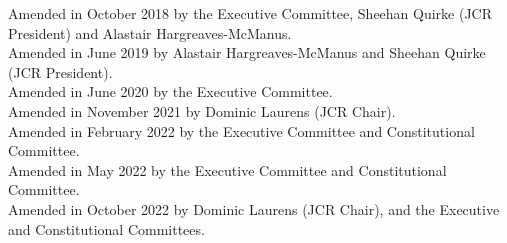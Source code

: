 \documentclass[12pt]{article}
\begin{document}
Amended in October 2018 by the Executive Committee, Sheehan Quirke (JCR President) and Alastair Hargreaves-McManus.\\
Amended in June 2019 by Alastair Hargreaves-McManus and Sheehan Quirke (JCR President).\\
Amended in June 2020 by the Executive Committee.\\
Amended in November 2021 by Dominic Laurens (JCR Chair).\\
Amended in February 2022 by the Executive Committee and Constitutional Committee.\\
Amended in May 2022 by the Executive Committee and Constitutional Committee.\\
Amended in October 2022 by Dominic Laurens (JCR Chair), and the Executive and Constitutional Committees.

\newpage
\tableofcontents{}
\newpage
\end{document}
